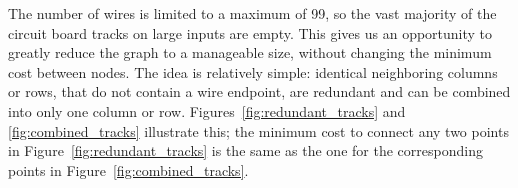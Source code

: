 \documentclass[sigconf,nonacm,screen]{acmart}
\begin{document}
The number of wires is limited to a maximum of 99, so the vast majority of the circuit board tracks on large inputs are empty. This gives us an opportunity to greatly reduce the graph to a manageable size, without changing the minimum cost between nodes. The idea is relatively simple: identical neighboring columns or rows, that do not contain a wire endpoint, are redundant and can be combined into only one column or row. Figures~\ref{fig:redundant_tracks} and \ref{fig:combined_tracks} illustrate this; the minimum cost to connect any two points in Figure~\ref{fig:redundant_tracks} is the same as the one for the corresponding points in Figure~\ref{fig:combined_tracks}.
\begin{figure}[h]
    \centering
\end{figure}
\end{document}
